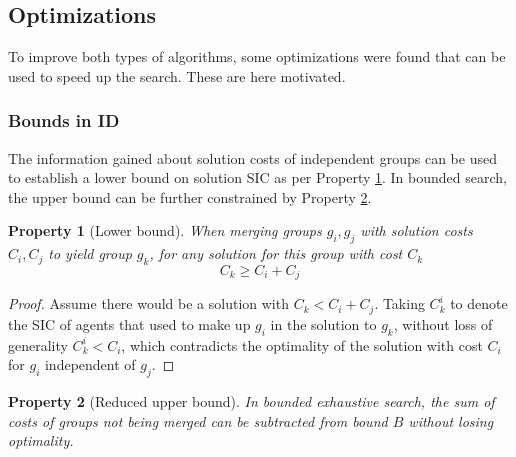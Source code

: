 \documentclass[english,10pt]{article}
\newtheorem{property}{Property}
\begin{document}
	\subsection{Optimizations}
	To improve both types of algorithms, some optimizations were found that can be used to speed up the search. These are here motivated. 
	\subsubsection{Bounds in ID}
	The information gained about solution costs of independent groups can be used to establish a lower bound on solution SIC as per Property \ref{property:id-lower}. In bounded search, the upper bound can be further constrained by Property \ref{property:id-upper}.
	\begin{property}[Lower bound]
		When merging groups $g_i,g_j$ with solution costs $C_i,C_j$ to yield group $g_k$, for any solution for this group with cost $C_k$
		\[C_k\geq C_i + C_j\]
		\label{property:id-lower}
	\end{property}
	\begin{proof}
		Assume there would be a solution with $C_k < C_i + C_j$. Taking $C_k^i$ to denote the SIC of agents that used to make up $g_i$ in the solution to $g_k$, without loss of generality $C_k^i < C_i$, which contradicts the optimality of the solution with cost $C_i$ for $g_i$ independent of $g_j$.
	\end{proof}
	\begin{property}[Reduced upper bound]
		In bounded exhaustive search, the sum of costs of groups not being merged can be subtracted from bound $B$ without losing optimality.
		\label{property:id-upper}
	\end{property}
\end{document}
